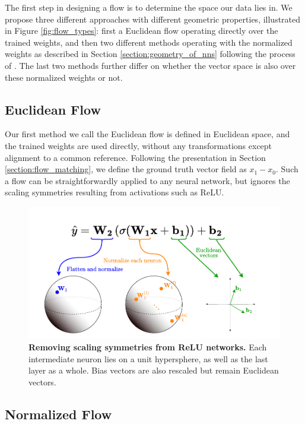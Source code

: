 The first step in designing a flow is to determine the space our data lies in. We propose three different approaches with different geometric properties, illustrated in Figure \ref{fig:flow_types}: first a Euclidean flow operating directly over the trained weights, and then two different methods operating with the normalized weights as described in Section \ref{section:geometry_of_nns} following the process of \citep{pittorinoDeepNetworksToroids2022}. The last two methods further differ on whether the vector space is also over these normalized weights or not. 

\subsection{Euclidean Flow}

Our first method we call the Euclidean flow is defined in Euclidean space, and the trained weights are used directly, without any transformations except alignment to a common reference.  Following the presentation in Section \ref{section:flow_matching}, we define the ground truth vector field as $x_1 - x_0$. Such a flow can be straightforwardly applied to any neural network, but ignores the scaling symmetries resulting from activations such as ReLU. 

\begin{figure}[t!]
    \centering
    \includegraphics[width=\textwidth]{figures/canonicalization.drawio.pdf}
    \caption{\label{fig:canonicalization}\textbf{Removing scaling symmetries from ReLU networks.} Each intermediate neuron lies on a unit hypersphere, as well as the last layer as a whole. Bias vectors are also rescaled but remain Euclidean vectors.}
\end{figure}


\subsection{Normalized Flow}

